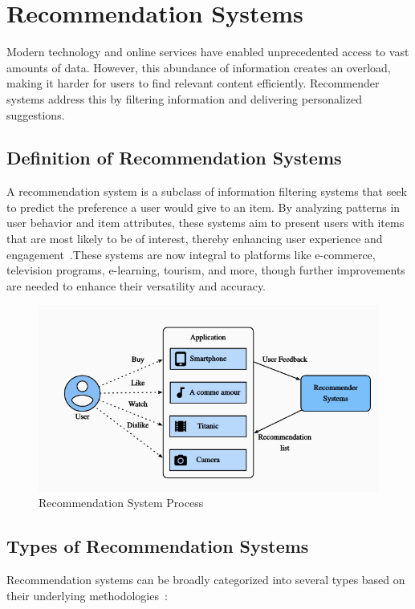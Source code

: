 \section{Recommendation Systems}
Modern technology and online services have enabled unprecedented access to vast amounts of data. However, this abundance of information creates an overload, making it harder for users to find relevant content efficiently. Recommender systems address this by filtering information and delivering personalized suggestions.
\subsection{Definition of Recommendation Systems}

A recommendation system is a subclass of information filtering systems that seek to predict the preference a user would give to an item. By analyzing patterns in user behavior and item attributes, these systems aim to present users with items that are most likely to be of interest, thereby enhancing user experience and engagement~\citep{Roy2022}.These systems are now integral to platforms like e-commerce, television programs, e-learning, tourism, and more, though further improvements are needed to enhance their versatility and accuracy.
\begin{figure}[ht]
		\centering
	\includegraphics[width=0.7\linewidth]{Figures/RS.png}
	\caption{Recommendation System Process}
	\label{Recommendation_System _Process}	
	\end{figure}

\subsection{Types of Recommendation Systems}

Recommendation systems can be broadly categorized into several types based on their underlying methodologies~\citep{maruti_recsys}:

